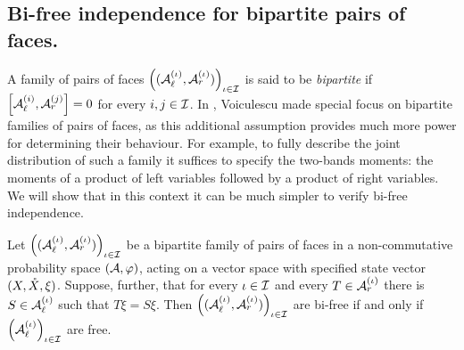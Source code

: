 \subsection{Bi-free independence for bipartite pairs of faces.}
A family of pairs of faces $\left((\mathcal{A}_\ell^{(\iota)}, \mathcal{A}_r^{(\iota)})\right)_{\iota\in\mathcal{I}}$ is said to be \emph{bipartite} if $\left[\mathcal{A}_\ell^{(i)}, \mathcal{A}_r^{(j)}\right] = 0$ for every $i, j \in \mathcal{I}$.
In \cite{voiculescu2014free,voiculescu2016free}, Voiculescu made special focus on bipartite families of pairs of faces, as this additional assumption provides much more power for determining their behaviour.
For example, to fully describe the joint distribution of such a family it suffices to specify the two-bands moments: the moments of a product of left variables followed by a product of right variables.
We will show that in this context it can be much simpler to verify bi-free independence.

\begin{theorem}
	\label{thm:bipartitefreetobifree}
	Let $\left((\mathcal{A}_\ell^{(\iota)}, \mathcal{A}_r^{(\iota)})\right)_{\iota\in\mathcal{I}}$ be a bipartite family of pairs of faces in a non-commutative probability space $(\mathcal{A}, \varphi)$, acting on a vector space with specified state vector $(X, \mathring{X}, \xi)$.
	Suppose, further, that for every $\iota \in \mathcal{I}$ and every $T \in \mathcal{A}_r^{(\iota)}$ there is $S \in \mathcal{A}_\ell^{(\iota)}$ such that $T\xi = S\xi$.
	Then $\left((\mathcal{A}_\ell^{(\iota)}, \mathcal{A}_r^{(\iota)})\right)_{\iota\in\mathcal{I}}$ are bi-free if and only if $\left(\mathcal{A}_\ell^{(\iota)}\right)_{\iota\in\mathcal{I}}$ are free.
\end{theorem}

